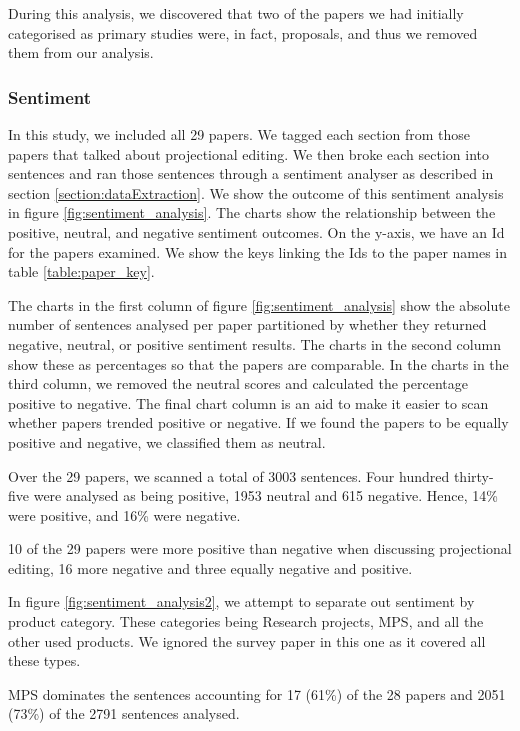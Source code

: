 During this analysis, we discovered that two of the papers we had initially categorised as primary studies were, in fact, proposals, and thus we removed them from our analysis.

\subsubsection{Sentiment}

In this study, we included all 29 papers.
We tagged each section from those papers that talked about projectional editing.
We then broke each section into sentences and ran those sentences through a sentiment analyser as described in section \ref{section:dataExtraction}.
We show the outcome of this sentiment analysis in figure \ref{fig:sentiment_analysis}. 
The charts show the relationship between the positive, neutral, and negative sentiment outcomes.
On the y-axis, we have an Id for the papers examined. 
We show the keys linking the Ids to the paper names in table \ref{table:paper_key}.

The charts in the first column of figure \ref{fig:sentiment_analysis} show the absolute number of sentences analysed per paper partitioned by whether they returned negative, neutral, or positive sentiment results.
The charts in the second column show these as percentages so that the papers are comparable.
In the charts in the third column, we removed the neutral scores and calculated the percentage positive to negative.
The final chart column is an aid to make it easier to scan whether papers trended positive or negative.
If we found the papers to be equally positive and negative, we classified them as neutral.

Over the 29 papers, we scanned a total of 3003 sentences.
Four hundred thirty-five were analysed as being positive, 1953 neutral and 615 negative.
Hence, 14\% were positive, and 16\% were negative.

10 of the 29 papers were more positive than negative when discussing projectional editing, 16 more negative and three equally negative and positive.

In figure \ref{fig:sentiment_analysis2}, we attempt to separate out sentiment by product category.  
These categories being Research projects, MPS, and all the other used products.
We ignored the survey paper in this one as it covered all these types.

MPS dominates the sentences accounting for 17 (61\%) of the 28 papers and 2051 (73\%) of the 2791 sentences analysed.

